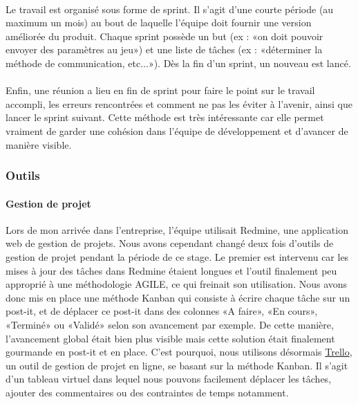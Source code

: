\paragraph{}Le travail est organisé sous forme de sprint. Il s’agit d’une courte période (au maximum un mois) au bout de laquelle l’équipe doit fournir une version améliorée du produit. Chaque sprint possède un but (ex : «on doit pouvoir envoyer des paramètres au jeu») et une liste de tâches (ex : «déterminer la méthode de communication, etc...»). Dès la fin d’un sprint, un nouveau est lancé.

\paragraph{}Enfin, une réunion a lieu en fin de sprint pour faire le point sur le travail accompli, les erreurs rencontrées et comment ne pas les éviter à l'avenir, ainsi que lancer le sprint suivant. Cette méthode est très intéressante car elle permet vraiment de garder une cohésion dans l’équipe de développement et d’avancer de manière visible. 

	\subsubsection{Outils}
		\paragraph{Gestion de projet\\}
Lors de mon arrivée dans l'entreprise, l’équipe utilisait Redmine, une application web de gestion de projets. Nous avons cependant changé deux fois d'outils de gestion de projet pendant la période de ce stage. Le premier est intervenu car les mises à jour des tâches dans Redmine étaient longues et l'outil finalement peu approprié à une méthodologie AGILE, ce qui freinait son utilisation. Nous avons donc mis en place une méthode Kanban qui consiste à écrire chaque tâche sur un post-it, et de déplacer ce post-it dans des colonnes «A faire», «En cours», «Terminé» ou «Validé» selon son avancement par exemple. De cette manière, l’avancement global était bien plus visible mais cette solution était finalement gourmande en post-it et en place. C'est pourquoi, nous utilisons désormais \href{www.trello.com}{Trello}, un outil de gestion de projet en ligne, se basant sur la méthode Kanban. Il s’agit d’un tableau virtuel dans lequel nous pouvons facilement déplacer les tâches, ajouter des commentaires ou des contraintes de temps notamment.

